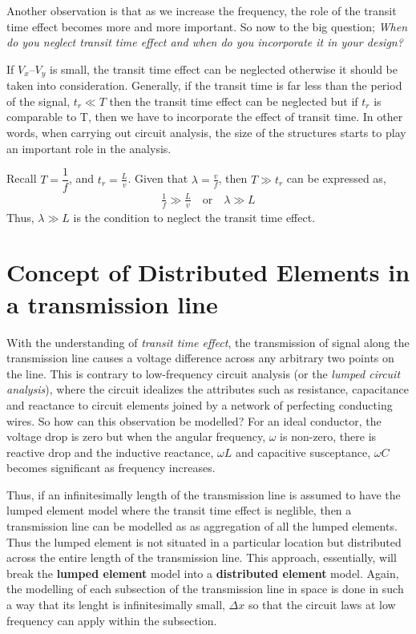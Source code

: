 Another observation is that as we increase the frequency, the role of the transit time effect becomes more and more important. So now to the big question; \textit{When do you neglect transit time effect and when do you incorporate it in your design?}


If $ V_{x} – V_{y} $ is small, the transit time effect can be neglected otherwise it should be taken into consideration. Generally, if the transit time is far less than the period of the signal,  $ t_{r} \ll T $ then the  transit time effect can be neglected but if $ t_{r} $ is comparable to T, then we have to incorporate the effect of transit time. In other words, when carrying out circuit analysis, the size of the structures starts to play an important role in the analysis.

Recall $T = \dfrac{1}{f} $, and $t_{r} = \frac{L}{v}$. Given that $ \lambda = \frac{v}{f} $, then $T \gg t_r$ can be expressed as, 
\begin{align*}
\frac{1}{f} \gg \frac{L}{v}\quad\text{or}\quad\lambda \gg L
\end{align*}
Thus, $ \lambda \gg L $ is the condition to neglect the transit time effect.


\section{Concept of Distributed Elements in a transmission line}
With the understanding of \textit{transit time effect}, the transmission of signal along the transmission line causes a voltage difference across any arbitrary two points on the line. This is contrary to low-frequency circuit analysis (or the \textit{lumped circuit analysis}), where the circuit idealizes the attributes such as resistance, capacitance and reactance to circuit elements joined by a network of perfecting conducting wires. So how can this observation be modelled? For an ideal conductor, the voltage drop is zero but when the angular frequency, $\omega$ is non-zero, there is reactive drop and the inductive reactance, $\omega L$ and capacitive susceptance, $\omega C$ becomes significant as frequency increases.

Thus, if an infinitesimally length of the transmission line is assumed to have the lumped element model where the transit time effect is neglible, then a transmission line can be modelled as as aggregation of all the lumped elements. Thus the lumped element is not situated in a particular location but distributed across the entire length of the transmission line. This approach, essentially, will break the \textbf{lumped element} model into a \textbf{distributed element} model. Again, the modelling of each subsection of the transmission line in space is done in such a way that its lenght is infinitesimally small, $\Delta x$ so that the circuit laws at low frequency can apply within the subsection.


